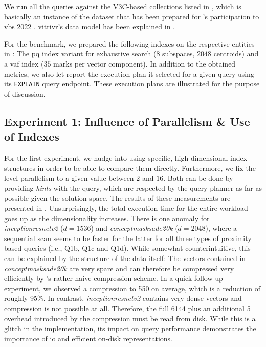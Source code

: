 We run all the queries against the V3C-based collections listed in , which is basically an instance of the dataset that has been prepared for \vitrivr{}'s \cite{Rossetto:2016Vitrivr,Gasser:2019Multimodal} participation to \acrshort{vbs} 2022 \cite{Heller:2022Multi}. vitrivr's data model has been explained in . 

For the benchmark, we prepared the following indexes on the respective entities in \cottontail{}: The \acrshort{pq} index variant for exhaustive search ($8$ subspaces, $2048$ centroids) and a \acrshort{vaf} index ($35$ marks per vector component). In addition to the obtained metrics, we also let \cottontail{} report the execution plan it selected for a given query using its \texttt{EXPLAIN} query endpoint. These execution plans are illustrated for the purpose of discussion.

\subsection{Experiment 1: Influence of Parallelism \& Use of Indexes}
For the first experiment, we nudge \cottontail{} into using specific, high-dimensional index structures in order to be able to compare them directly. Furthermore, we fix the level parallelism to a given value between $2$ and $16$. Both can be done by providing \emph{hints} with the query, which are respected by the query planner as far as possible given the solution space. The results of these measurements are presented in . Unsurprisingly, the total execution time for the entire workload goes up as the dimensionality increases. There is one anomaly for \emph{inceptionresnetv2} ($d = 1536$) and \emph{conceptmasksade20k} ($d = 2048$), where a sequential scan seems to be faster for the latter for all three types of proximity based queries (i.e., Q1b, Q1c and Q1d). While somewhat counterintuitive, this can be explained by the structure of the data itself: The vectors contained in \emph{conceptmasksade20k} are very spare and can therefore be compressed very efficiently by \cottontail{}'s rather naive compression scheme. In a quick follow-up experiment, we observed a compression to \SI{550}{\byte} on average, which is a reduction of roughly 95\%. In contrast, \emph{inceptionresnetv2} contains very dense vectors and compression is not possible at all. Therefore, the full \SI{6144}{\byte} plus an additional \SI{5}{\byte} overhead introduced by the compression must be read from disk. While this is a glitch in the implementation, its impact on query performance demonstrates the importance of \acrshort{io} and efficient on-disk representations.

